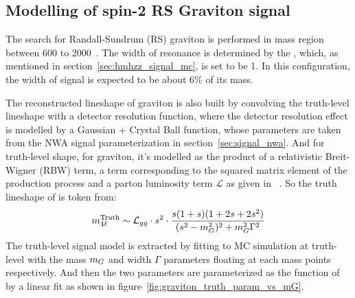 \subsection{Modelling of spin-2 RS Graviton signal}

The search for Randall-Sundrum (RS) graviton is performed in mass region between 600 to 2000~\gev.
The width of resonance is determined by the \kOverMpl, which, as mentioned in section~\ref{sec:hmhzz_signal_mc}, is set to be 1. 
In this configuration, the width of signal is expected to be about 6\% of its mass.

The reconstructed \mfl lineshape of graviton is also built by convolving the truth-level lineshape with a detector resolution function,
where the detector resolution effect is modelled by a Gaussian + Crystal Ball function, whose parameters are taken from the NWA signal parameterization in section~\ref{sec:signal_nwa}.
And for truth-level shape, for graviton, it's modelled as the product of a relativistic Breit-Wigner (RBW) term, a term corresponding to the squared matrix element of the production process and a parton luminosity term $\mathcal{L}$ as given in ~\cite{Bijnens_2001}.
So the truth lineshape of \mfl is token from:
\begin{equation*}
        m_{4\ell}^{\text{Truth}} \sim \mathcal{L}_{gg} \cdot s^2 \cdot \frac{s(1 + s)(1 + 2s + 2s^2)}{(s^2 - m_{G}^2)^2 + m_{G}^2 \Gamma^2}
\end{equation*}
The truth-level signal model is extracted by fitting to MC simulation at truth-level with the mass $m_{G}$ and width $\Gamma$ parameters floating at each mass points respectively.
And then the two parameters are parameterized as the function of \mH by a linear fit as shown in figure~\ref{fig:graviton_truth_param_vs_mG}.
